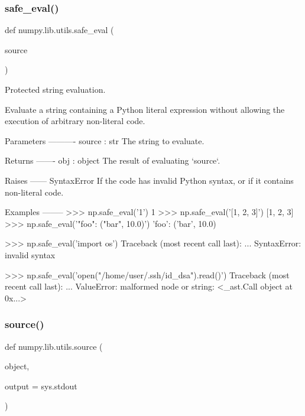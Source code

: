 \subsubsection{\texorpdfstring{safe\+\_\+eval()}{safe\_eval()}}
{\footnotesize\ttfamily def numpy.\+lib.\+utils.\+safe\+\_\+eval (\begin{DoxyParamCaption}\item[{}]{source }\end{DoxyParamCaption})}

\begin{DoxyVerb}Protected string evaluation.

Evaluate a string containing a Python literal expression without
allowing the execution of arbitrary non-literal code.

Parameters
----------
source : str
    The string to evaluate.

Returns
-------
obj : object
   The result of evaluating `source`.

Raises
------
SyntaxError
    If the code has invalid Python syntax, or if it contains
    non-literal code.

Examples
--------
>>> np.safe_eval('1')
1
>>> np.safe_eval('[1, 2, 3]')
[1, 2, 3]
>>> np.safe_eval('{"foo": ("bar", 10.0)}')
{'foo': ('bar', 10.0)}

>>> np.safe_eval('import os')
Traceback (most recent call last):
  ...
SyntaxError: invalid syntax

>>> np.safe_eval('open("/home/user/.ssh/id_dsa").read()')
Traceback (most recent call last):
  ...
ValueError: malformed node or string: <_ast.Call object at 0x...>\end{DoxyVerb}
 \mbox{\label{namespacenumpy_1_1lib_1_1utils_a95d697b2cd971f6f15b6d6643afd0fae}} 
\subsubsection{\texorpdfstring{source()}{source()}}
{\footnotesize\ttfamily def numpy.\+lib.\+utils.\+source (\begin{DoxyParamCaption}\item[{}]{object,  }\item[{}]{output = {\ttfamily sys.stdout} }\end{DoxyParamCaption})}

